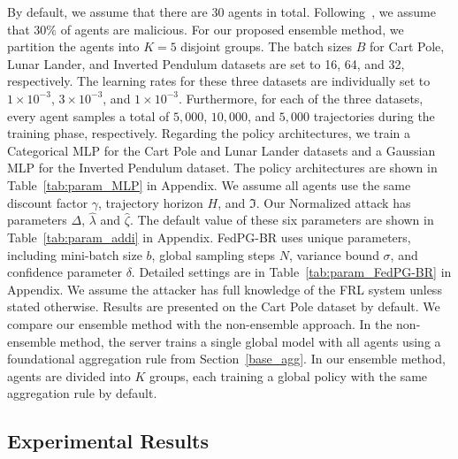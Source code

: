 By default, we assume that there are 30 agents in total.
Following~\cite{fan2021fault}, we assume that $30\%$ of agents are malicious. 
%
For our proposed ensemble method, we 
partition the agents into $K=5$ 
disjoint groups.
%
%
%
%
The batch sizes $B$ for Cart Pole, Lunar Lander, and Inverted Pendulum datasets are set to 16, 64, and 32, respectively. The learning rates for these three datasets are individually set to $1 \times 10^{-3}$, $3\times10^{-3}$, and $1\times10^{-3}$. Furthermore, for each of the three datasets, every agent samples a total of $5,000$, $10,000$, and $5,000$ trajectories during the training phase, respectively. Regarding the policy architectures, we train a Categorical MLP for the Cart Pole and Lunar Lander datasets and a Gaussian MLP for the Inverted Pendulum dataset. 
The policy architectures are shown in Table~\ref{tab:param_MLP} in Appendix.
%
We assume all agents use the same discount factor $\gamma$, trajectory horizon $H$, and $\Im$.
Our Normalized attack has parameters $ \Delta$, $\hat{\lambda}$ and $\hat{\zeta}$.
The default value of these six parameters are shown in Table~\ref{tab:param_addi} in Appendix.
%
%
%
FedPG-BR uses unique parameters, including mini-batch size \(b\), global sampling steps \(N\), variance bound \(\sigma\), and confidence parameter \(\delta\). Detailed settings are in Table~\ref{tab:param_FedPG-BR} in Appendix. We assume the attacker has full knowledge of the FRL system unless stated otherwise. Results are presented on the Cart Pole dataset by default.
%
%
We compare our ensemble method with the non-ensemble approach. In the non-ensemble method, the server trains a single global model with all agents using a foundational aggregation rule from Section~\ref{base_agg}. In our ensemble method, agents are divided into \(K\) groups, each training a global policy with the same aggregation rule by default.



\subsection{Experimental Results} 

